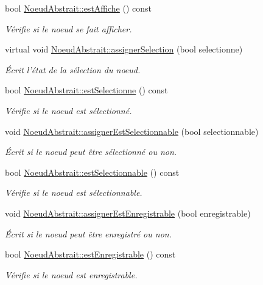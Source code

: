 \begin{DoxyCompactItemize}
bool \hyperlink{group__inf2990_ga07fc02e86d59ccd2680f9e5f5b8e373d}{Noeud\-Abstrait\-::est\-Affiche} () const 
\begin{DoxyCompactList}\small\item\em Vérifie si le noeud se fait afficher. \end{DoxyCompactList}\item 
virtual void \hyperlink{group__inf2990_ga0f39647390d357d8662a870f0c76242c}{Noeud\-Abstrait\-::assigner\-Selection} (bool selectionne)
\begin{DoxyCompactList}\small\item\em Écrit l'état de la sélection du noeud. \end{DoxyCompactList}\item 
bool \hyperlink{group__inf2990_ga8fb7a3313ce4d361ef7ec8e45ba8add5}{Noeud\-Abstrait\-::est\-Selectionne} () const 
\begin{DoxyCompactList}\small\item\em Vérifie si le noeud est sélectionné. \end{DoxyCompactList}\item 
void \hyperlink{group__inf2990_ga397add0bac7ec3b842598a2085990b7d}{Noeud\-Abstrait\-::assigner\-Est\-Selectionnable} (bool selectionnable)
\begin{DoxyCompactList}\small\item\em Écrit si le noeud peut être sélectionné ou non. \end{DoxyCompactList}\item 
bool \hyperlink{group__inf2990_gaa3f3a34571af62de0da5db2d8f54f690}{Noeud\-Abstrait\-::est\-Selectionnable} () const 
\begin{DoxyCompactList}\small\item\em Vérifie si le noeud est sélectionnable. \end{DoxyCompactList}\item 
void \hyperlink{group__inf2990_gabb7f3756a4094dc588690126ec0703d3}{Noeud\-Abstrait\-::assigner\-Est\-Enregistrable} (bool enregistrable)
\begin{DoxyCompactList}\small\item\em Écrit si le noeud peut être enregistré ou non. \end{DoxyCompactList}\item 
bool \hyperlink{group__inf2990_ga6a6af3639f1b4e3e33a126703376dcec}{Noeud\-Abstrait\-::est\-Enregistrable} () const 
\begin{DoxyCompactList}\small\item\em Vérifie si le noeud est enregistrable. \end{DoxyCompactList}\item 

\end{DoxyCompactItemize}
